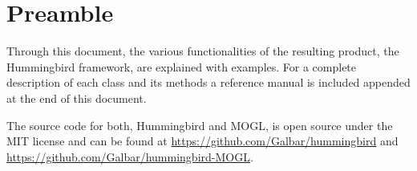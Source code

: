 \chapter{Preamble}\label{ch:preamble}

Through this document, the various functionalities of the resulting product, the Hummingbird 
framework, are explained with examples. For a complete description of each class and 
its methods a reference manual is included appended at the end of this document.

The source code for both, Hummingbird and MOGL, is open source under the MIT license and can be found 
at \url{https://github.com/Galbar/hummingbird} and \url{https://github.com/Galbar/hummingbird-MOGL}.
